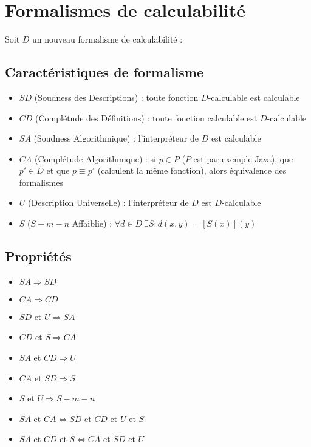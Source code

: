 \section{Formalismes de calculabilité}

Soit $D$ un nouveau formalisme de calculabilité :

\subsection{Caractéristiques de formalisme}

\begin{itemize}
\item $SD$ (Soudness des Descriptions) : toute fonction $D$-calculable est calculable
\item $CD$ (Complétude des Définitions) : toute fonction calculable est $D$-calculable
\item $SA$ (Soudness Algorithmique) : l'interpréteur de $D$ est calculable
\item $CA$ (Complétude Algorithmique) : si $p \in P$ ($P$ est par exemple Java), que $p' \in D$ et que $p \equiv p'$ (calculent la même fonction), alors équivalence des formalismes
\item $U$ (Description Universelle) : l'interpréteur de $D$ est $D$-calculable
\item $S$ ($S-m-n$ Affaiblie) : $\forall d \in D \ \exists S : d(x,y) = [S(x)](y)$
\end{itemize}

\subsection{Propriétés}

\begin{itemize}
\item $SA \Rightarrow SD$
\item $CA \Rightarrow CD$
\item $SD$ et $U \Rightarrow SA$
\item $CD$ et $S \Rightarrow CA$
\item $SA$ et $CD \Rightarrow U$
\item $CA$ et $SD \Rightarrow S$
\item $S$ et $U \Rightarrow S-m-n$
\item $SA$ et $CA \Leftrightarrow SD$ et $CD$ et $U$ et $S$
\item $SA$ et $CD$ et $S \Leftrightarrow CA$ et $SD$ et $U$
\end{itemize}


